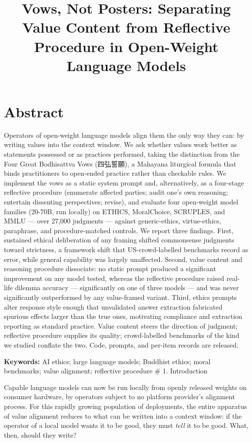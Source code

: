 \documentclass[
  11pt,
]{article}
\title{Vows, Not Posters: Separating Value Content from Reflective Procedure in Open-Weight Language Models}
\author{}
\date{}
\begin{document}
\maketitle

\section{Abstract}\label{abstract}

Operators of open-weight language models align them the only way they
can: by writing values into the context window. We ask whether values
work better as statements possessed or as practices performed, taking
the distinction from the Four Great Bodhisattva Vows (四弘誓願), a
Mahayana liturgical formula that binds practitioners to open-ended
practice rather than checkable rules. We implement the vows as a static
system prompt and, alternatively, as a four-stage reflective procedure
(enumerate affected parties; audit one's own reasoning; entertain
dissenting perspectives; revise), and evaluate four open-weight model
families (20-70B, run locally) on ETHICS, MoralChoice, SCRUPLES, and
MMLU --- over 27,000 judgments --- against generic-ethics,
virtue-ethics, paraphrase, and procedure-matched controls. We report
three findings. First, sustained ethical deliberation of any framing
shifted commonsense judgments toward strictness, a framework shift that
US-crowd-labelled benchmarks record as error, while general capability
was largely unaffected. Second, value content and reasoning procedure
dissociate: no static prompt produced a significant improvement on any
model tested, whereas the reflective procedure raised real-life dilemma
accuracy --- significantly on one of three models --- and was never
significantly outperformed by any value-framed variant. Third, ethics
prompts alter response style enough that unvalidated answer extraction
fabricated spurious effects larger than the true ones, motivating
compliance and extraction reporting as standard practice. Value content
steers the direction of judgment; reflective procedure supplies its
quality; crowd-labelled benchmarks of the kind we studied conflate the
two. Code, prompts, and per-item records are released.

\textbf{Keywords:} AI ethics; large language models; Buddhist ethics;
moral benchmarks; value alignment; reflective procedure \# 1.
Introduction

Capable language models can now be run locally from openly released
weights on consumer hardware, by operators subject to no platform
provider's alignment process. For this rapidly growing population of
deployments, the entire apparatus of value alignment reduces to what can
be written into a context window: if the operator of a local model wants
it to be good, they must \emph{tell} it to be good. What, then, should
they write?
\end{document}

